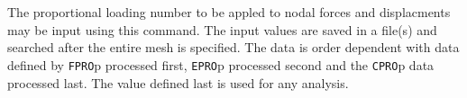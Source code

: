     \\{\smallskip}
\\{\smallskip}
 \\{\smallskip}
 \\{\smallskip}
 \\{\smallskip}
 \\{\smallskip}
 \\{\smallskip}
 \\{\smallskip}
 \\{\smallskip}
 \\{\smallskip}
 \\{\smallskip}
 \\{\smallskip}
 \\{\smallskip}
 \\{\smallskip}
 \\{\smallskip}
 \\{\smallskip}
 \\{\smallskip}
\headb

The proportional loading number to be appled to nodal forces and displacments
may be input using this command.
The input values are saved in a file(s) and searched
after the entire mesh is specified.
The data is order dependent with data
defined by {\tt FPRO}p processed first, {\tt EPRO}p processed second and
the {\tt CPRO}p data processed last.  The value defined last is used for
any analysis.

